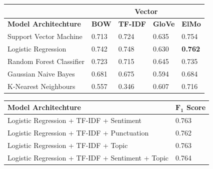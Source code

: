 \documentclass[12pt,a4paper]{article}
\begin{document}
\begin{center}
	\begin{tabular}{ |p{4.7cm}||p{1.2cm}|p{1.5cm}|p{1.2cm}|p{1.2cm}|  }
		\hline
		& \multicolumn{4}{|c|}{\textbf{Vector}} \\
		\hline
		\textbf{Model Architechture}& \textbf{BOW} & \textbf{TF-IDF} & \textbf{GloVe} & \textbf{ElMo}\\
		\hline\hline
		Support Vector Machine   & 0.713    & 0.724 &   0.635 & 0.754\\
		Logistic Regression &   0.742 & 0.748 & 0.630 & \textbf{0.762}\\
		Random Forest Classifier &0.723 & 0.715 &  0.645 & 0.735\\
		Gaussian Naive Bayes  & 0.681  & 0.675&  0.594 &0.684\\
		K-Nearest Neighbours & 0.557  & 0.346   & 0.607 & 0.716\\
		\hline
	\end{tabular}
\end{center}

\begin{center}
	\begin{tabular}{|p{9cm}||p{2cm}| }
		\hline
		\textbf{Model Architechture}&  \textbf{$\mathbf{F_1}$ Score}\\
		\hline\hline
		Logistic Regression + TF-IDF + Sentiment   & 0.763\\
		Logistic Regression + TF-IDF + Punctuation & 0.762\\
		Logistic Regression + TF-IDF + Topic   & 0.763\\
		Logistic Regression + TF-IDF + Sentiment + Topic & 0.764\\
		\hline
	\end{tabular}
\end{center}



%
\end{document}
